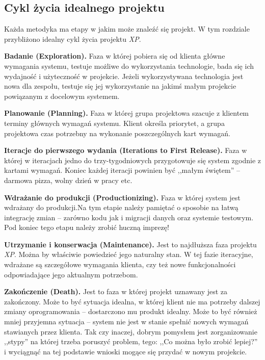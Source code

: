 \subsection{Cykl życia idealnego projektu}
\label{sec:ZMTOcykl}

Każda metodyka ma etapy w jakim może znaleźć się projekt. W tym rozdziale przybliżono idealny cykl życia projektu \textit{XP}.

\begin{packed_enum}
    \item \textbf{Badanie (Exploration).} Faza w której pobiera się od klienta główne wymagania systemu, testuje możliwe do wykorzystania technologie, bada się ich wydajność i użyteczność w projekcie. Jeżeli wykorzystywana technologia jest nowa dla zespołu, testuje się jej wykorzystanie na jakimś małym projekcie powiązanym z docelowym systemem.
    \item \textbf{Planowanie (Planning).} Faza w której grupa projektowa szacuje z klientem terminy głównych wymagań systemu. Klient określa priorytet, a grupa projektowa czas potrzebny na wykonanie poszczególnych kart wymagań.
    \item \textbf{Iteracje do pierwszego wydania (Iterations to First Release).} Faza w której w iteracjach jedno do trzy-tygodniowych przygotowuje się system zgodnie z kartami wymagań. Koniec każdej iteracji powinien być ,,małym świętem'' -- darmowa pizza, wolny dzień w pracy etc.
    \item \textbf{Wdrażanie do produkcji (Productionizing).} Faza w której system jest wdrażany do produkcji.Na tym etapie należy pamiętać o sposobie na łatwą integrację zmian -- zarówno kodu jak i migracji danych oraz systemie testowym. Pod koniec tego etapu należy zrobić huczną imprezę!
    \item \textbf{Utrzymanie i konserwacja (Maintenance).} Jest to najdłuższa faza projektu \textit{XP}. Można by właściwie powiedzieć jego naturalny stan. W tej fazie iteracyjne, wdrażane są szczegółowe wymagania klienta, czy też nowe funkcjonalności odpowiadające jego aktualnym potrzebom.
    \item \textbf{Zakończenie (Death).} Jest to faza w której projekt uznawany jest za zakończony. Może to być sytuacja idealna, w której klient nie ma potrzeby dalszej zmiany oprogramowania -- dostarczono mu produkt idealny. Może to być również mniej przyjemna sytuacja -- system nie jest w stanie spełnić nowych wymagań stawianych przez klienta. Tak czy inaczej, dobrym pomysłem jest zorganizowanie ,,stypy'' na której trzeba poruszyć problem, tego: ,,Co można było zrobić lepiej?'' i wyciągnąć na tej podstawie wnioski mogące się przydać w nowym projekcie.
\end{packed_enum}

